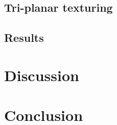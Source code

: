 \documentclass{acmsiggraph}               %
\begin{document}
\subsection{Tri-planar texturing}

\subsection{Results}

\section{Discussion}

\section{Conclusion}




\end{document}
